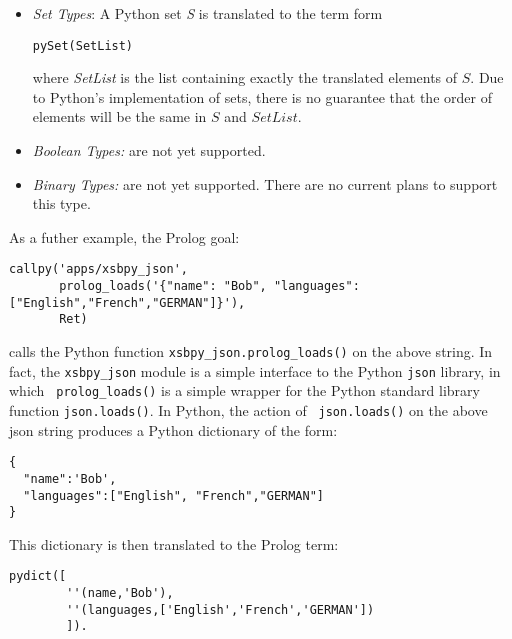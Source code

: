 \begin{description}
\begin{itemize}
         {\tt pyDict(DictList)}

         where {\tt DictList} is a list of tuples in term form: 

         {\tt ''(Key,Value)}

         where {\tt Key} and {\tt Value} are the translations of any
         Python data structures that are both allowable as a
         dictionary key or value, and supported by {\tt xsbpy}.  For
         instance, {\tt Value} can be (the term form of) a list, a
         set, a tuple or another dictionary.

       \item {\em Set Types}: A Python set {\em S} is translated to
         the term form

         {\tt pySet(SetList)}

         where {\em SetList} is the list containing exactly the
         translated elements of $S$.  Due to Python's implementation
         of sets, there is no guarantee that the order of elements
         will be the same in $S$ and $SetList$.
       \item {\em Boolean Types:} are not yet supported. 
       \item {\em Binary Types:} are not yet supported.  There are no
         current plans to support this type.
     \end{itemize}

 As a futher example, the Prolog goal:

 \begin{verbatim}
callpy('apps/xsbpy_json',
       prolog_loads('{"name": "Bob", "languages": ["English","French","GERMAN"]}'),
       Ret)
\end{verbatim}
 
\noindent 
calls the Python function {\tt xsbpy\_json.prolog\_loads()} on the
above string.  In fact, the {\tt xsbpy\_json} module is a simple
interface to the Python {\tt json} library, in which {\tt
  prolog\_loads()} is a simple wrapper for the Python standard library
function {\tt json.loads()}.  In Python, the action of {\tt
  json.loads()} on the above json string produces a Python dictionary
of the form:
\begin{verbatim}
{
  "name":'Bob',
  "languages":["English", "French","GERMAN"]
}
\end{verbatim}
This dictionary is then translated to the Prolog term:
\begin{verbatim}
pydict([
        ''(name,'Bob'),
        ''(languages,['English','French','GERMAN'])
        ]).
\end{verbatim}


\end{description}
